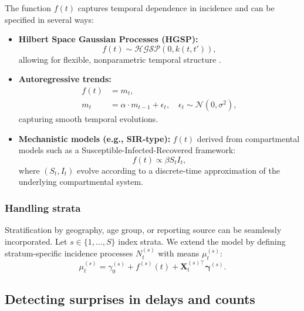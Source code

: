 \documentclass[12pt]{article}
\begin{document}
The function $f(t)$ captures temporal dependence in incidence and can be specified in several ways:

\begin{itemize}
    \item \textbf{Hilbert Space Gaussian Processes (HGSP):}
    \begin{equation}
        f(t) \sim \mathcal{HGSP}(0, k(t,t')),
    \end{equation}
    allowing for flexible, nonparametric temporal structure \cite{riutort2023practical}.

    \item \textbf{Autoregressive trends:}
    \begin{equation}
    \begin{aligned}
        f(t) &= m_t, \\
        m_t &= \alpha\cdot  m_{t-1} + \epsilon_t, \quad \epsilon_t \sim \mathcal{N}(0, \sigma^2),
    \end{aligned}
    \end{equation}
    capturing smooth temporal evolutions.

    \item \textbf{Mechanistic models (e.g., SIR-type):}  $f(t)$ derived from compartmental models such as a Susceptible-Infected-Recovered framework:
    \begin{equation}
        f(t) \propto \beta S_t I_t,
    \end{equation}
    where $(S_t, I_t)$ evolve according to a discrete-time approximation of the underlying compartmental system.
\end{itemize}


\subsubsection{Handling strata}

Stratification by geography, age group, or reporting source can be seamlessly incorporated. Let $s \in \{1, \dots, S\}$ index strata. We extend the model by defining stratum-specific incidence processes $N_t^{(s)}$ with means $\mu_t^{(s)}$:
\begin{equation}
    \mu_t^{(s)} = \gamma_0^{(s)} + f^{(s)}(t) + \mathbf{X}_t^{(s)\top} \boldsymbol{\gamma}^{(s)}.
\end{equation}

\subsection{\color{red} Detecting surprises in delays and counts}
\end{document}
